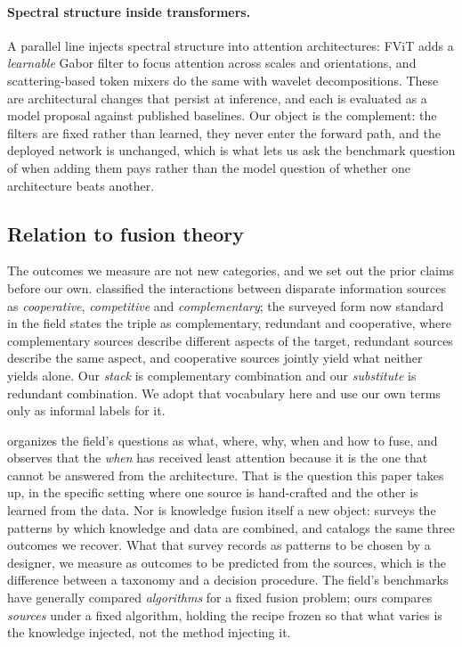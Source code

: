 \paragraph{Spectral structure inside transformers.}
A parallel line injects spectral structure into attention architectures:
FViT \citep{shi2026fvit} adds a \emph{learnable} Gabor filter to focus
attention across scales and orientations, and scattering-based token mixers
do the same with wavelet decompositions. These are architectural changes that
persist at inference, and each is evaluated as a model proposal against
published baselines. Our object is the
complement: the filters are fixed rather than learned, they never enter
the forward path, and the deployed network is unchanged, which is what
lets us ask the benchmark question of when adding them pays rather than
the model question of whether one architecture beats another.


\subsection{Relation to fusion theory}\label{sec:fusiontheory}
The outcomes we measure are not new categories, and we set out the prior
claims before our own. \citet{durrantwhyte1988sensor} classified the
interactions between disparate information sources as \emph{cooperative},
\emph{competitive} and \emph{complementary}; the surveyed form now standard
in the field \citep{khaleghi2013multisensor} states the triple as
complementary, redundant and cooperative, where complementary sources
describe different aspects of the target, redundant sources describe the
same aspect, and cooperative sources jointly yield what neither yields
alone. Our \emph{stack} is complementary combination and our
\emph{substitute} is redundant combination. We adopt that vocabulary here
and use our own terms only as informal labels for it.

\citet{dasarathy2001what} organizes the field's questions as what, where,
why, when and how to fuse, and observes that the \emph{when} has received
least attention because it is the one that cannot be answered from the
architecture. That is the question this paper takes up, in the specific
setting where one source is hand-crafted and the other is learned from the
data. Nor is knowledge fusion itself a new object: \citet{smirnov2019knowledge}
surveys the patterns by which knowledge and data are combined, and catalogs
the same three outcomes we recover. What that survey records as patterns to
be chosen by a designer, we measure as outcomes to be predicted from the
sources, which is the difference between a taxonomy and a decision
procedure. The field's benchmarks have generally compared \emph{algorithms}
for a fixed fusion problem; ours compares
\emph{sources} under a fixed algorithm, holding the recipe frozen so that
what varies is the knowledge injected, not the method injecting it.

